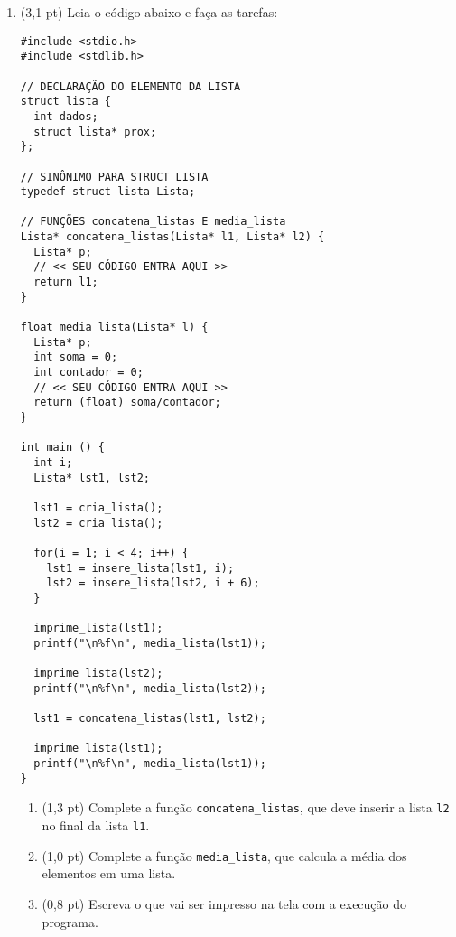 \documentclass[a4paper,10pt]{article}
\begin{document}
\begin{multicols*}{2}
\begin{enumerate}
  \bigskip

  \item (3,1 pt) Leia o código abaixo e faça as tarefas:

  \begin{verbatim}
#include <stdio.h>
#include <stdlib.h>

// DECLARAÇÃO DO ELEMENTO DA LISTA
struct lista {
  int dados;
  struct lista* prox;
};

// SINÔNIMO PARA STRUCT LISTA
typedef struct lista Lista;

// FUNÇÕES concatena_listas E media_lista
Lista* concatena_listas(Lista* l1, Lista* l2) {
  Lista* p;
  // << SEU CÓDIGO ENTRA AQUI >>
  return l1;
}

float media_lista(Lista* l) {
  Lista* p;
  int soma = 0;
  int contador = 0;
  // << SEU CÓDIGO ENTRA AQUI >>
  return (float) soma/contador;
}

int main () {
  int i;
  Lista* lst1, lst2;

  lst1 = cria_lista();
  lst2 = cria_lista();

  for(i = 1; i < 4; i++) {
    lst1 = insere_lista(lst1, i);
    lst2 = insere_lista(lst2, i + 6);
  }

  imprime_lista(lst1);
  printf("\n%f\n", media_lista(lst1));

  imprime_lista(lst2);
  printf("\n%f\n", media_lista(lst2));

  lst1 = concatena_listas(lst1, lst2);

  imprime_lista(lst1);
  printf("\n%f\n", media_lista(lst1));
}
  \end{verbatim}

  \begin{enumerate}
    \item (1,3 pt) Complete a função \texttt{concatena\_listas}, que deve inserir a lista \texttt{l2} no final da lista \texttt{l1}.
    \item (1,0 pt) Complete a função \texttt{media\_lista}, que calcula a média dos elementos em uma lista.
    \item (0,8 pt) Escreva o que vai ser impresso na tela com a execução do programa.
  \end{enumerate}
\end{enumerate}
\end{multicols*}
\end{document}
